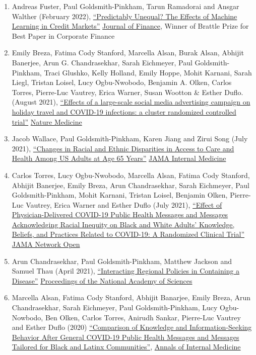 \documentclass[letterpaper]{article}
\begin{document}
\begin{enumerate}
\item Andreas Fuster, Paul Goldsmith-Pinkham, Tarun Ramadorai and Ansgar Walther (February 2022), \href{https://papers.ssrn.com/sol3/papers.cfm?abstract_id=3072038}{``Predictably Unequal? The Effects of Machine Learning in Credit Markets''} \ul{Journal of Finance}, Winner of Brattle Prize for Best Paper in Corporate Finance
\item Emily Breza, Fatima Cody Stanford, Marcella Alsan, Burak Alsan, Abhijit Banerjee, Arun G. Chandrasekhar, Sarah Eichmeyer, Paul Goldsmith-Pinkham, Traci Glushko, Kelly Holland, Emily Hoppe, Mohit Karnani, Sarah Liegl, Tristan Loisel, Lucy Ogbu-Nwobodo, Benjamin A. Olken, Carlos Torres, Pierre-Luc Vautrey, Erica Warner, Susan Wootton \& Esther Duflo. (August 2021), \href{https://www.nature.com/articles/s41591-021-01487-3.pdf}{``Effects of a large-scale social media advertising campaign on holiday travel and COVID-19 infections: a cluster randomized controlled trial''} \ul{Nature Medicine}
\item Jacob Wallace, Paul Goldsmith-Pinkham, Karen Jiang and Zirui Song (July 2021), \href{https://jamanetwork.com/journals/jamainternalmedicine/article-abstract/2782345}{``Changes in Racial and Ethnic Disparities in Access to Care and Health Among US Adults at Age 65 Years''} \ul{JAMA Internal Medicine}
\item Carlos Torres, Lucy Ogbu-Nwobodo, Marcella Alsan, Fatima Cody Stanford, Abhijit Banerjee, Emily Breza, Arun Chandrasekhar, Sarah Eichmeyer, Paul Goldsmith-Pinkham, Mohit Karnani, Tristan Loisel, Benjamin Olken, Pierre-Luc Vautrey, Erica Warner and Esther Duflo (July 2021), \href{https://jamanetwork.com/journals/jamanetworkopen/fullarticle/2781934}{``Effect of Physician-Delivered COVID-19 Public Health Messages and Messages Acknowledging Racial Inequity on Black and White Adults’ Knowledge, Beliefs, and Practices Related to COVID-19: A Randomized Clinical Trial''} \ul{JAMA Network Open}
\item Arun Chandrasekhar, Paul Goldsmith-Pinkham, Matthew Jackson and Samuel Thau (April 2021), \href{https://arxiv.org/abs/2008.10745}{``Interacting Regional Policies in Containing a Disease''} \ul{Proceedings of the National Academy of Sciences}
\item Marcella Alsan, Fatima Cody Stanford, Abhijit Banarjee, Emily Breza, Arun Chandrasekhar, Sarah Eichmeyer, Paul Goldsmith-Pinkham, Lucy Ogbu-Nowbodo, Ben Olken, Carlos Torres, Anirudh Sankar, Pierre-Luc Vautrey and Esther Duflo (2020) \href{https://www.acpjournals.org/doi/10.7326/M20-6141}{``Comparison of Knowledge and Information-Seeking Behavior After General COVID-19 Public Health Messages and Messages Tailored for Black and Latinx Communities''}, \ul{Annals of Internal Medicine}

\end{enumerate}
\end{document}
